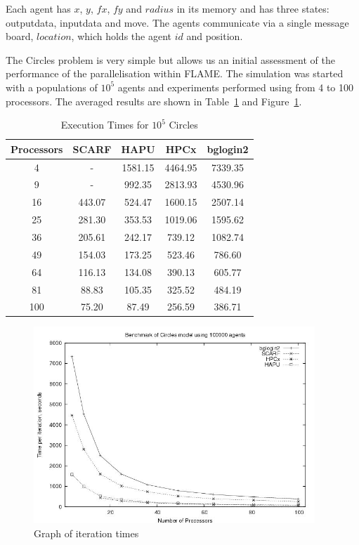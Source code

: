 Each agent has $x$, $y$, $fx$, $fy$ and $radius$ in its memory and has three states: outputdata, inputdata and move. The agents communicate via a single message board, $location$, which holds the agent $id$ and position.

The Circles problem is very simple but allows us an initial assessment of the performance of the parallelisation within FLAME. The simulation was started with a populations of $10^5$  agents and experiments performed using from 4 to 100 processors. The averaged results are shown in Table~\ref{tab:ExecutionTimesForCircles} and Figure~\ref{fig:Circles-graph}.
{
\renewcommand{\arraystretch}{1.25}
\begin{table}[ht]
 \centering
  \begin{tabular}{c|cccc}
 Processors &SCARF  &HAPU  &HPCx  &bglogin2 \\ \hline
4 &- &1581.15 &4464.95 &7339.35 \\
9 &- &992.35 &2813.93 &4530.96  \\
16 &443.07 &524.47 &1600.15 &2507.14    \\
25 &281.30 &353.53 &1019.06 &1595.62    \\
36 &205.61 &242.17 &739.12 &1082.74     \\
49 &154.03 &173.25 &523.46 &786.60      \\
64 &116.13 &134.08 &390.13 &605.77      \\
81 &88.83 &105.35 &325.52 &484.19       \\
100 &75.20 &87.49 &256.59 &386.71       \\

 \end{tabular}
 \caption{Execution Times for $10^5$ Circles}
 \label{tab:ExecutionTimesForCircles}
\end{table}
}
\begin{figure}[ht]
 \centering
  \includegraphics[width=300pt]{Circles-graph.jpg}
 \caption{Graph of iteration times}
 \label{fig:Circles-graph}
\end{figure}

